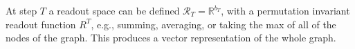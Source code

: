 \documentclass[letterpaper]{article} %
\newcommand{\ron}[1]{{{\textcolor{red}{\textbf{[Ron:} {#1}\textbf{]}}}}}
\begin{document}
At step $T$ a readout space can be defined $\mathcal{R}_T = \mathbb{R}^{b_T}$, with a permutation invariant readout function $R^T$, e.g., summing, averaging, or taking the max of all of the nodes of the graph. %
This produces a vector representation of the whole graph. %



 







 
\end{document}
